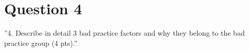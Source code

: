 \section{Question 4}

''4. Describe in detail 3 bad practice factors and why they belong to the bad practice group (4 pts).''